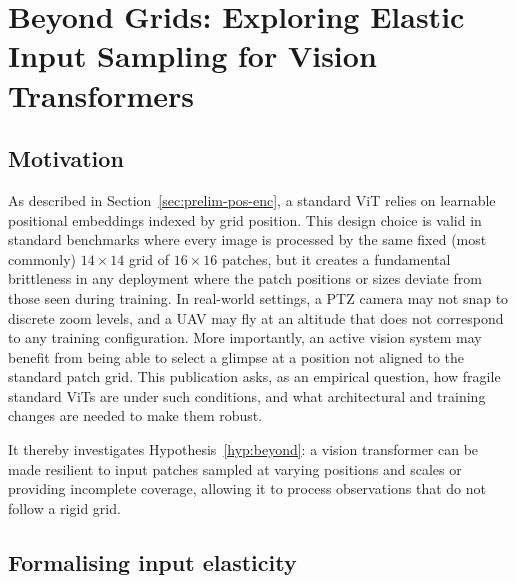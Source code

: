 \section{Beyond Grids: Exploring Elastic Input Sampling for Vision Transformers}
\label{sec:beyond}

\subsection{Motivation}
\label{sec:motivation-beyond}

As described in Section~\ref{sec:prelim-pos-enc}, a standard ViT relies on learnable positional embeddings indexed by grid position. This design choice is valid in standard benchmarks where every image is processed by the same fixed (most commonly) $14\times14$ grid of $16\times16$ patches, but it creates a fundamental brittleness in any deployment where the patch positions or sizes deviate from those seen during training. In real-world settings, a PTZ camera may not snap to discrete zoom levels, and a UAV may fly at an altitude that does not correspond to any training configuration. More importantly, an active vision system may benefit from being able to select a glimpse at a position not aligned to the standard patch grid. This publication asks, as an empirical question, how fragile standard ViTs are under such conditions, and what architectural and training changes are needed to make them robust.

It thereby investigates Hypothesis~\ref{hyp:beyond}: a vision transformer can be made resilient to input patches sampled at varying positions and scales or providing incomplete coverage, allowing it to process observations that do not follow a rigid grid.

\subsection{Formalising input elasticity}
\label{sec:beyond-elasticity}


